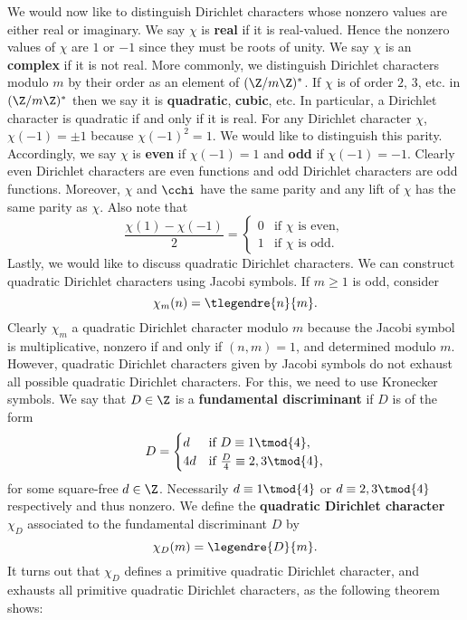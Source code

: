       We would now like to distinguish Dirichlet characters whose nonzero values are either real or imaginary. We say $\chi$ is \textbf{real} if it is real-valued. Hence the nonzero values of $\chi$ are $1$ or $-1$ since they must be roots of unity. We say $\chi$ is an \textbf{complex} if it is not real. More commonly, we distinguish Dirichlet characters modulo $m$ by their order as an element of $(\Z/m\Z)^{\ast}$. If $\chi$ is of order $2$, $3$, etc. in $(\Z/m\Z)^{\ast}$ then we say it is \textbf{quadratic}, \textbf{cubic}, etc. In particular, a Dirichlet character is quadratic if and only if it is real. For any Dirichlet character $\chi$, $\chi(-1) = \pm 1$ because $\chi(-1)^{2} = 1$. We would like to distinguish this parity. Accordingly, we say $\chi$ is \textbf{even} if $\chi(-1) = 1$ and \textbf{odd} if $\chi(-1) = -1$. Clearly even Dirichlet characters are even functions and odd Dirichlet characters are odd functions. Moreover, $\chi$ and $\cchi$ have the same parity and any lift of $\chi$ has the same parity as $\chi$. Also note that
      \[
        \frac{\chi(1)-\chi(-1)}{2} = \begin{cases} 0 & \text{if $\chi$ is even}, \\ 1 & \text{if $\chi$ is odd}. \end{cases}
      \]
      Lastly, we would like to discuss quadratic Dirichlet characters. We can construct quadratic Dirichlet characters using Jacobi symbols. If $m \ge 1$ is odd, consider
      \[
        \chi_{m}(n) = \tlegendre{n}{m}.
      \]
      Clearly $\chi_{m}$ a quadratic Dirichlet character modulo $m$ because the Jacobi symbol is multiplicative, nonzero if and only if $(n,m) = 1$, and determined modulo $m$. However, quadratic Dirichlet characters given by Jacobi symbols do not exhaust all possible quadratic Dirichlet characters. For this, we need to use Kronecker symbols. We say that $D \in \Z$ is a \textbf{fundamental discriminant} if $D$ is of the form
      \[
        D = \begin{cases} d & \text{if $D \equiv 1 \tmod{4}$}, \\ 4d & \text{if $\frac{D}{4} \equiv 2,3 \tmod{4}$}, \end{cases}
      \]
      for some square-free $d \in \Z$. Necessarily $d \equiv 1 \tmod{4}$ or $d \equiv 2,3 \tmod{4}$ respectively and thus nonzero. We define the \textbf{quadratic Dirichlet character} $\chi_{D}$ associated to the fundamental discriminant $D$ by
      \[
        \chi_{D}(m) = \legendre{D}{m}.
      \]
      It turns out that $\chi_{D}$ defines a primitive quadratic Dirichlet character, and exhausts all primitive quadratic Dirichlet characters, as the following theorem shows:

